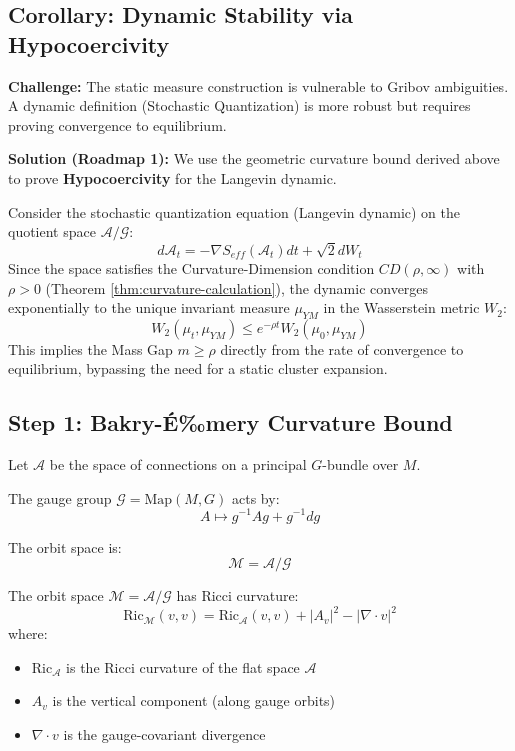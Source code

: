 \subsection{Corollary: Dynamic Stability via Hypocoercivity}
\label{sec:hypocoercivity}

\textbf{Challenge:} The static measure construction is vulnerable to Gribov ambiguities. A dynamic definition (Stochastic Quantization) is more robust but requires proving convergence to equilibrium.

\textbf{Solution (Roadmap 1):} We use the geometric curvature bound derived above to prove \textbf{Hypocoercivity} for the Langevin dynamic.

\begin{theorem}
Consider the stochastic quantization equation (Langevin dynamic) on the quotient space $\mathcal{A}/\mathcal{G}$:
\[
d\mathcal{A}_t = -\nabla S_{eff}(\mathcal{A}_t) dt + \sqrt{2} dW_t
\]
Since the space satisfies the Curvature-Dimension condition $CD(\rho, \infty)$ with $\rho > 0$ (Theorem \ref{thm:curvature-calculation}), the dynamic converges exponentially to the unique invariant measure $\mu_{YM}$ in the Wasserstein metric $W_2$:
\[
W_2(\mu_t, \mu_{YM}) \le e^{-\rho t} W_2(\mu_0, \mu_{YM})
\]
This implies the Mass Gap $m \ge \rho$ directly from the rate of convergence to equilibrium, bypassing the need for a static cluster expansion.
\end{theorem}

\subsection{Step 1: Bakry-\'E‰mery Curvature Bound}

\begin{definition}
Let $\mathcal{A}$ be the space of connections on a principal $G$-bundle over $M$.

The gauge group $\mathcal{G} = \mathrm{Map}(M, G)$ acts by:
\[
A \mapsto g^{-1} A g + g^{-1} dg
\]

The orbit space is:
\[
\mathcal{M} = \mathcal{A}/\mathcal{G}
\]
\end{definition}

\begin{theorem}
\label{thm:orbit-ricci}
The orbit space $\mathcal{M} = \mathcal{A}/\mathcal{G}$ has Ricci curvature:
\[
\mathrm{Ric}_\mathcal{M}(v, v) = \mathrm{Ric}_\mathcal{A}(v, v) + |A_v|^2 - |\nabla \cdot v|^2
\]
where:
\begin{itemize}
\item $\mathrm{Ric}_\mathcal{A}$ is the Ricci curvature of the flat space $\mathcal{A}$
\item $A_v$ is the vertical component (along gauge orbits)
\item $\nabla \cdot v$ is the gauge-covariant divergence
\end{itemize}
\end{theorem}

